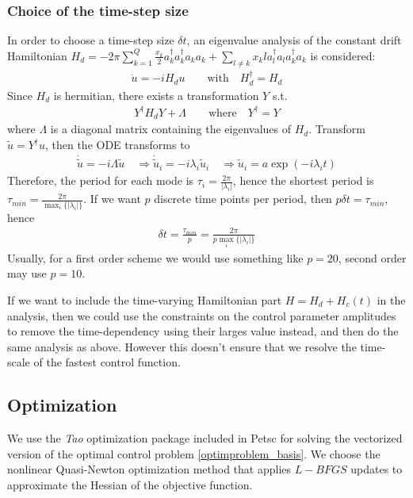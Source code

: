 \documentclass[letterpaper]{article}
\begin{document}
    \subsubsection{Choice of the time-step size}
    In order to choose a time-step size $\delta t$, an eigenvalue analysis of the constant drift Hamiltonian $H_d =  -2\pi \sum_{k=1}^Q \frac{x_k}{2} a_k^{\dagger}a_k^{\dagger}a_ka_k + \sum_{l\neq k} x_kl a_l^{\dagger}a_l a_k^{\dagger}a_k$ is considered:
       \begin{align*}  
         \dot u = -i H_d u \qquad \text{with} \quad H_d^{\dagger}  = H_d
       \end{align*} 
       Since $H_d$ is hermitian, there exists a transformation $Y$ s.t. 
       \begin{align*}
         Y^{\dagger}H_d Y + \Lambda \qquad  \text{where} \quad Y^{\dagger} = Y
       \end{align*}
       where $\Lambda$ is a diagonal matrix containing the eigenvalues of $H_d$. Transform $\tilde u = Y^{\dagger} u$, then the ODE transforms to 
       \begin{align*}
         \dot \tilde u = -i \Lambda \tilde u \quad \Rightarrow \dot \tilde u_i = -i\lambda_i \tilde u_i \quad \Rightarrow \tilde u_i = a \exp(-i\lambda_i t)
       \end{align*}
       Therefore, the period for each mode is $\tau_i = \frac{2\pi}{|\lambda_i|}$, hence the shortest period is $\tau_{min} = \frac{2\pi}{\max_i\{|\lambda_i|\}}$. If we want $p$ discrete time points per period, then $p\delta t = \tau_{min}$, hence 
       \begin{align*}
         \delta t = \frac{\tau_{min}}{p} = \frac{2\pi}{p\max_i\{|\lambda_i|\}}
       \end{align*}
       Usually, for a first order scheme we would use something like $p=20$, second order may use $p=10$. 

       If we want to include the time-varying Hamiltonian part $H = H_d + H_c(t)$ in the analysis, then we could use the constraints on the control parameter amplitudes to remove the time-dependency using their larges value instead, and then do the same analysis as above. However this doesn't ensure that we resolve the time-scale of the fastest control function. 

  \subsection{Optimization}
    We use the \textit{Tao} optimization package included in Petsc for solving the vectorized version of the optimal control problem \eqref{optimproblem_basis}. We choose the nonlinear Quasi-Newton optimization method that applies $L-BFGS$ updates to approximate the Hessian of the objective function. 
\end{document}
